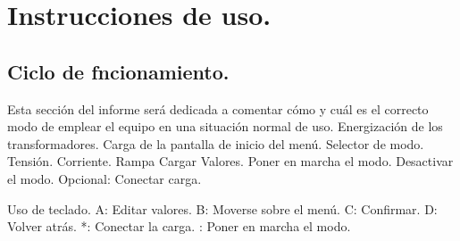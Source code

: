 \chapter{Instrucciones de uso.}

\label{C:Forma de operar la fuente DC}

\section{Ciclo de fncionamiento.}

Esta sección del informe será dedicada a comentar cómo y cuál es el correcto modo de emplear el equipo en una situación normal de uso.
Energización de los transformadores.
Carga de la pantalla de inicio del menú.
Selector de modo. Tensión. Corriente. Rampa
Cargar Valores.
Poner en marcha el modo.
Desactivar el modo.
Opcional: Conectar carga.

Uso de teclado.
A: Editar valores.
B: Moverse sobre el menú.
C: Confirmar.
D: Volver atrás.
*: Conectar la carga.
: Poner en marcha el modo.
